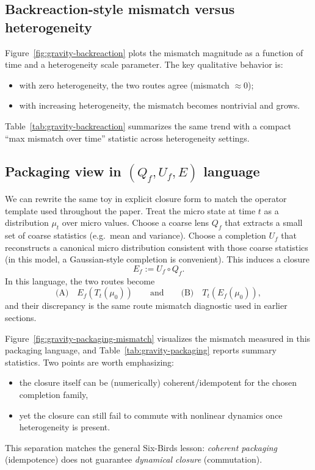 \documentclass[11pt]{article}
\providecommand{\Qf}{Q_f}
\providecommand{\Uf}{U_f}
\begin{document}
\subsection{Backreaction-style mismatch versus heterogeneity}
Figure~\ref{fig:gravity-backreaction} plots the mismatch magnitude as a function of time and a heterogeneity scale parameter. The key qualitative behavior is:
\begin{itemize}
  \item with zero heterogeneity, the two routes agree (mismatch $\approx 0$);
  \item with increasing heterogeneity, the mismatch becomes nontrivial and grows.
\end{itemize}
Table~\ref{tab:gravity-backreaction} summarizes the same trend with a compact ``max mismatch over time'' statistic across heterogeneity settings.

\subsection{Packaging view in $(\Qf,\Uf,E)$ language}
We can rewrite the same toy in explicit closure form to match the operator template used throughout the paper. Treat the micro state at time $t$ as a distribution $\mu_t$ over micro values. Choose a coarse lens $\Qf$ that extracts a small set of coarse statistics (e.g.\ mean and variance). Choose a completion $\Uf$ that reconstructs a canonical micro distribution consistent with those coarse statistics (in this model, a Gaussian-style completion is convenient). This induces a closure
\[
  E_f := \Uf\circ\Qf.
\]
In this language, the two routes become
\[
  \text{(A)}\quad E_f(T_t(\mu_0))
  \qquad\text{and}\qquad
  \text{(B)}\quad T_t(E_f(\mu_0)),
\]
and their discrepancy is the same route mismatch diagnostic used in earlier sections.

Figure~\ref{fig:gravity-packaging-mismatch} visualizes the mismatch measured in this packaging language, and Table~\ref{tab:gravity-packaging} reports summary statistics. Two points are worth emphasizing:
\begin{itemize}
  \item the closure itself can be (numerically) coherent/idempotent for the chosen completion family,
  \item yet the closure can still fail to commute with nonlinear dynamics once heterogeneity is present.
\end{itemize}
This separation matches the general Six-Birds lesson: \emph{coherent packaging} (idempotence) does not guarantee \emph{dynamical closure} (commutation).
\end{document}
